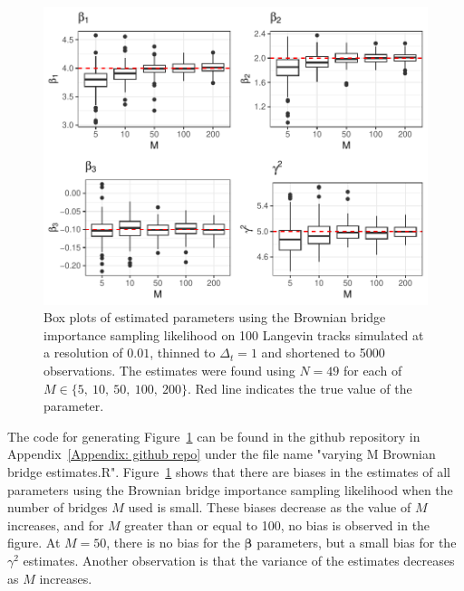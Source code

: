 \begin{figure}[H]
    \centering
    \includegraphics[width=\linewidth]{Images/Results/varying M estimates boxplot BB.pdf}
    \caption[Box plots of Parameter Estimates using Brownian bridge importance sampling using different numbers of bridges]{Box plots of estimated parameters using the Brownian bridge importance sampling likelihood on 100 Langevin tracks simulated at a resolution of $0.01$, thinned to $\Delta_t = 1$ and shortened to 5000 observations. The estimates were found using $N=49$ for each of $M \in \{5 , \ 10, \ 50, \ 100, \ 200\}$. Red line indicates the true value of the parameter.}
    \label{fig:varying M boxplots brownian bridge}
\end{figure}

The code for generating Figure~\ref{fig:varying M boxplots brownian bridge} can be found in the github repository in Appendix~\ref{Appendix: github repo} under the file name "varying M Brownian bridge estimates.R". Figure~\ref{fig:varying M boxplots brownian bridge} shows that there are biases in the estimates of all parameters using the Brownian bridge importance sampling likelihood when the number of bridges $M$ used is small. These biases decrease as the value of $M$ increases, and for $M$ greater than or equal to 100, no bias is observed in the figure. At $M =50$, there is no bias for the $\bm \beta$ parameters, but a small bias for the $\gamma^2$ estimates. Another observation is that the variance of the estimates decreases as $M$ increases.



